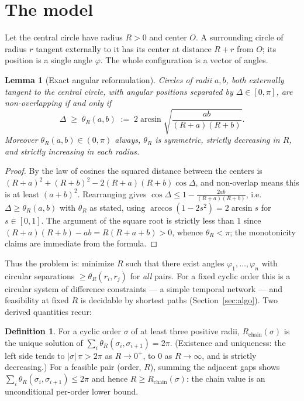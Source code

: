 \documentclass[11pt]{article}
\newtheorem{lemma}[theorem]{Lemma}
\theoremstyle{definition}
\newtheorem{definition}[theorem]{Definition}
\theoremstyle{remark}
\DeclareMathOperator{\asin}{arcsin}
\begin{document}
\section{The model}\label{sec:model}

Let the central circle have radius $R>0$ and center $O$. A surrounding circle of radius $r$ tangent externally to it has its center at distance $R+r$ from $O$; its position is a single angle $\varphi$. The whole configuration is a vector of angles.

\begin{lemma}[Exact angular reformulation]\label{lem:angular}
Circles of radii $a,b$, both externally tangent to the central circle, with angular positions separated by $\Delta\in[0,\pi]$, are non-overlapping if and only if
\[
\Delta \;\ge\; \theta_R(a,b)\;:=\;2\asin\sqrt{\frac{ab}{(R+a)(R+b)}}.
\]
Moreover $\theta_R(a,b)\in(0,\pi)$ always, $\theta_R$ is symmetric, strictly decreasing in $R$, and strictly increasing in each radius.
\end{lemma}

\begin{proof}
By the law of cosines the squared distance between the centers is $(R+a)^2+(R+b)^2-2(R+a)(R+b)\cos\Delta$, and non-overlap means this is at least $(a+b)^2$. Rearranging gives $\cos\Delta\le 1-\frac{2ab}{(R+a)(R+b)}$, i.e.\ $\Delta\ge\theta_R(a,b)$ with $\theta_R$ as stated, using $\arccos(1-2s^2)=2\asin s$ for $s\in[0,1]$. The argument of the square root is strictly less than $1$ since $(R+a)(R+b)-ab=R(R+a+b)>0$, whence $\theta_R<\pi$; the monotonicity claims are immediate from the formula.
\end{proof}

Thus the problem is: minimize $R$ such that there exist angles $\varphi_1,\dots,\varphi_n$ with circular separations $\ge\theta_R(r_i,r_j)$ for \emph{all} pairs. For a fixed cyclic order this is a circular system of difference constraints --- a simple temporal network --- and feasibility at fixed $R$ is decidable by shortest paths (Section~\ref{sec:algo}). Two derived quantities recur:

\begin{definition}
For a cyclic order $\sigma$ of at least three positive radii, $R_{\mathrm{chain}}(\sigma)$ is the unique solution of $\sum_i \theta_R(\sigma_i,\sigma_{i+1})=2\pi$. (Existence and uniqueness: the left side tends to $|\sigma|\,\pi>2\pi$ as $R\to0^+$, to $0$ as $R\to\infty$, and is strictly decreasing.) For a feasible pair (order, $R$), summing the adjacent gaps shows $\sum_i\theta_R(\sigma_i,\sigma_{i+1})\le2\pi$ and hence $R\ge R_{\mathrm{chain}}(\sigma)$: the chain value is an unconditional per-order lower bound.
\end{definition}
\end{document}

